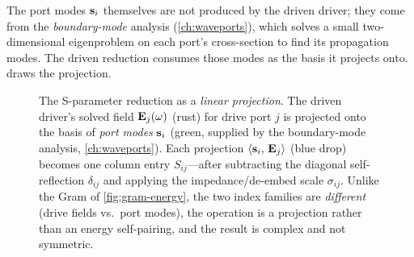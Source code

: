 The port modes $\mathbf{s}_i$ themselves are not produced by the driven driver; they
come from the \emph{boundary-mode} analysis (\cref{ch:waveports}), which solves a
small two-dimensional eigenproblem on each port's cross-section to find its
propagation modes. The driven reduction consumes those modes as the basis it
projects onto.  draws the projection.

\begin{figure}[t]
\centering
{}
\caption[Port projection of a driven field]{The S-parameter reduction as a
\emph{linear projection}. The driven driver's solved field $\mathbf{E}_j(\omega)$ (rust)
for drive port $j$ is projected onto the basis of \emph{port modes} $\mathbf{s}_i$
(green, supplied by the boundary-mode analysis, \cref{ch:waveports}). Each
projection $\left\langle \mathbf{s}_i,\, \mathbf{E}_j\right\rangle$ (blue drop) becomes one column entry
$S_{ij}$---after subtracting the diagonal self-reflection $\delta_{ij}$ and
applying the impedance/de-embed scale $\sigma_{ij}$. Unlike the Gram of
\cref{fig:gram-energy}, the two index families are \emph{different} (drive fields
vs.\ port modes), the operation is a projection rather than an energy
self-pairing, and the result is complex and not symmetric.}
\label{fig:proj}
\end{figure}

